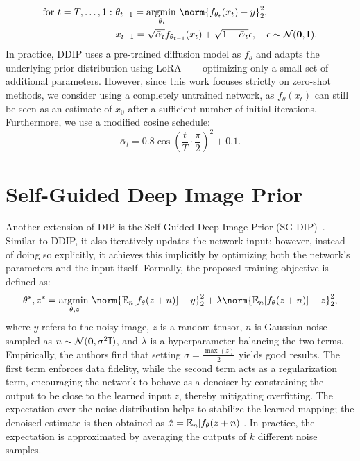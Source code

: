 \begin{align}
    \text{for}\ t=T,\dots,1:\ &\theta_{t-1} = \argmin_{\theta_t} \norm{f_{\theta_t}(x_t) - y}_2^2,\\
    &x_{t-1} = \sqrt{\bar{\alpha}_t}f_{\theta_{t-1}}(x_t) + \sqrt{1-\bar{\alpha}_t}\epsilon, \quad \epsilon \sim \unormal.
\end{align}
In practice, DDIP uses a pre-trained diffusion model as $f_\theta$ and adapts the underlying prior distribution using LoRA~\cite{LoRA} --- optimizing only a small set of additional parameters.
However, since this work focuses strictly on zero-shot methods, we consider using a completely untrained network, as $f_\theta(x_t)$ can still be seen as an estimate of $x_0$ after a sufficient number of initial iterations.
Furthermore, we use a modified cosine schedule: 
\begin{equation}
    \bar{\alpha}_t = 0.8\cos\left(\frac{t}{T}\cdot\frac{\pi}{2}\right)^2+0.1.
\end{equation}

\section{Self-Guided Deep Image Prior}\label{sec:SG-DIP}

Another extension of DIP is the Self-Guided Deep Image Prior (SG-DIP)~\cite{SG-DIP}.
Similar to DDIP, it also iteratively updates the network input; however, instead of doing so explicitly, it achieves this implicitly by optimizing both the network's parameters and the input itself.
Formally, the proposed training objective is defined as:
\begin{equation}\label{eq:SG-DIP}
    \theta^*,z^* = \argmin_{\theta, z} \norm{\E[n]{f_\theta(z + n)} - y}_2^2 + \lambda\norm{\E[n]{f_\theta(z + n)} - z}_2^2,
\end{equation}
where $y$ refers to the noisy image, $z$ is a random tensor, $n$ is Gaussian noise sampled as $n \sim \normal$, and $\lambda$ is a hyperparameter balancing the two terms.
Empirically, the authors find that setting $\sigma = \frac{\max(z)}{2}$ yields good results.
The first term enforces data fidelity, while the second term acts as a regularization term, encouraging the network to behave as a denoiser by constraining the output to be close to the learned input $z$, thereby mitigating overfitting. 
The expectation over the noise distribution helps to stabilize the learned mapping; the denoised estimate is then obtained as $\hat{x} = \E[n]{f_\theta(z + n)}$.
In practice, the expectation is approximated by averaging the outputs of $k$ different noise samples.

